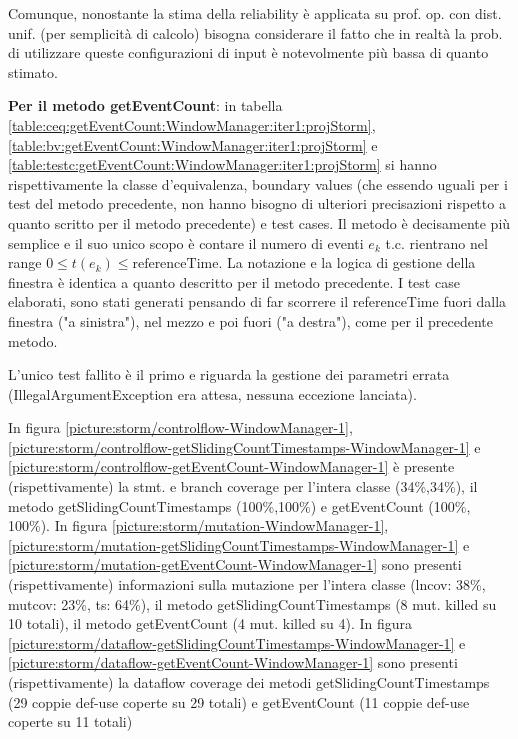 \documentclass[10pt, a4paper]{article}
\newcommand{\gettablelabel}[5]{table:#1:#2:#3:iter#4:proj#5}
\newcommand{\getpicturelabel}[1]{picture:#1}
\def\storm{Storm}
\begin{document}
	Comunque, nonostante la stima della reliability è applicata su 
	prof. op. con dist. unif. (per semplicità di calcolo) bisogna considerare il fatto che in realtà la prob. 
	di utilizzare queste configurazioni di input è notevolmente più bassa di quanto stimato.
	
	\textbf{Per il metodo getEventCount}: in tabella 
	\ref{\gettablelabel{ceq}{getEventCount}{WindowManager}{1}{\storm}}, 
	\ref{\gettablelabel{bv}{getEventCount}{WindowManager}{1}{\storm}} e 
	\ref{\gettablelabel{testc}{getEventCount}{WindowManager}{1}{\storm}} si hanno rispettivamente la
	classe d'equivalenza, boundary values 
	(che essendo uguali per i test del metodo precedente, non hanno bisogno di ulteriori precisazioni rispetto a 
	quanto scritto per il metodo precedente) e test cases. Il metodo è decisamente più semplice e il suo unico scopo
	è contare il numero di eventi $e_k$ t.c. rientrano nel range $0 \le t(e_k) \le \text{referenceTime}$.
	La notazione e la logica di gestione della finestra è identica a quanto descritto per il metodo precedente.
	I test case elaborati, sono stati generati pensando di far scorrere il 
	referenceTime fuori dalla finestra ("a sinistra"), nel mezzo e poi fuori ("a destra"), come per il precedente
	metodo.
	
	L'unico test fallito è il primo e riguarda la gestione dei parametri errata 
	(IllegalArgumentException era attesa, nessuna eccezione lanciata).
	
	In figura \ref{\getpicturelabel{storm/controlflow-WindowManager-1}}, 
	\ref{\getpicturelabel{storm/controlflow-getSlidingCountTimestamps-WindowManager-1}} e
	\ref{\getpicturelabel{storm/controlflow-getEventCount-WindowManager-1}} 
	è presente (rispettivamente) la stmt. e branch coverage
	per l'intera classe (34\%,34\%), il metodo getSlidingCountTimestamps (100\%,100\%) e getEventCount 
	(100\%, 100\%). In figura 
	\ref{\getpicturelabel{storm/mutation-WindowManager-1}},
	\ref{\getpicturelabel{storm/mutation-getSlidingCountTimestamps-WindowManager-1}} e 
	\ref{\getpicturelabel{storm/mutation-getEventCount-WindowManager-1}} sono presenti (rispettivamente)
	informazioni sulla
	mutazione per l'intera classe (lncov: 38\%, mutcov: 23\%, ts: 64\%), 
	il metodo getSlidingCountTimestamps (8 mut. killed su 10 totali), 
	il metodo getEventCount (4 mut. killed su 4).
	In figura 
	\ref{\getpicturelabel{storm/dataflow-getSlidingCountTimestamps-WindowManager-1}} e 
	\ref{\getpicturelabel{storm/dataflow-getEventCount-WindowManager-1}} sono presenti (rispettivamente) la 
	dataflow coverage dei metodi getSlidingCountTimestamps (29 coppie def-use coperte su 29 totali) 
	e getEventCount (11 coppie def-use coperte su 11 totali)
	
\end{document}
